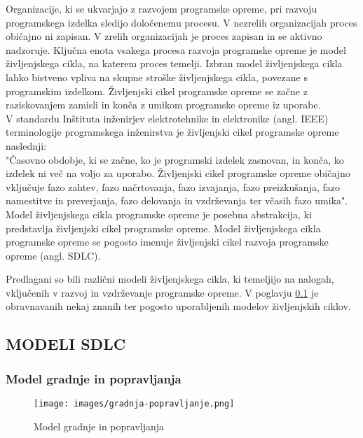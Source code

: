 \documentclass[a4paper,12pt,openright]{book}
\begin{document}
Organizacije, ki se ukvarjajo z razvojem programske opreme, pri razvoju programskega izdelka sledijo določenemu procesu. V nezrelih organizacijah proces običajno ni zapisan. V zrelih organizacijah je proces zapisan in se aktivno nadzoruje. Ključna enota vsakega procesa razvoja programske opreme je model življenjskega cikla, na katerem proces temelji. Izbran model življenjskega cikla lahko bistveno vpliva na skupne stroške življenjskega cikla, povezane s programskim izdelkom. Življenjski cikel programske opreme se začne z raziskovanjem zamisli in konča z umikom programske opreme iz uporabe. \\
V standardu Inštituta inženirjev elektrotehnike in elektronike (angl. IEEE) terminologije programskega inženirstva je življenjski cikel programske opreme naslednji: \\
"Časovno obdobje, ki se začne, ko je programski izdelek zasnovan, in konča, ko izdelek ni več na voljo za uporabo. Življenjski cikel programske opreme običajno vključuje fazo zahtev, fazo načrtovanja, fazo izvajanja, fazo preizkušanja, fazo namestitve in preverjanja, fazo delovanja in vzdrževanja ter včasih fazo umika". \\
Model življenjskega cikla programske opreme je posebna abstrakcija, ki predstavlja življenjski cikel programske opreme. Model življenjskega cikla programske opreme se pogosto imenuje življenjski cikel razvoja programske opreme (angl. SDLC). \cite{aggarwal2005software}


Predlagani so bili različni modeli življenjskega cikla, ki temeljijo na nalogah, vključenih v razvoj in vzdrževanje programske opreme. V poglavju \ref{chap:SDLC} je obravnavanih nekaj znanih ter pogosto uporabljenih modelov življenjskih ciklov.
\subsection{MODELI SDLC} \label{chap:SDLC}
\subsubsection{Model gradnje in popravljanja}
\begin{figure}[H]
    \centering
    \texttt{[image: images/gradnja-popravljanje.png]}
    \caption{Model gradnje in popravljanja}
    \label{fig:gradnja}
\end{figure}
\end{document}
